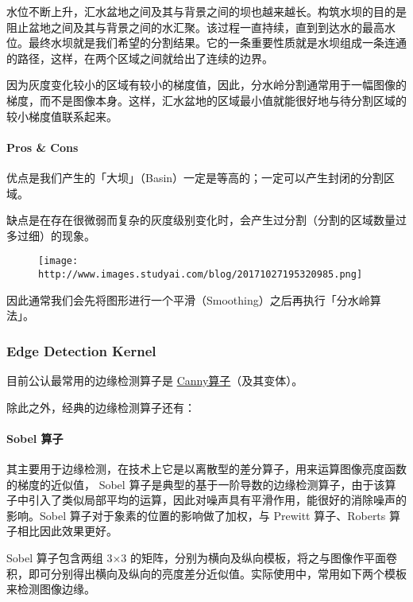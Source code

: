 \documentclass[
]{article}
\begin{document}
水位不断上升，汇水盆地之间及其与背景之间的坝也越来越长。构筑水坝的目的是阻止盆地之间及其与背景之间的水汇聚。该过程一直持续，直到到达水的最高水位。最终水坝就是我们希望的分割结果。它的一条重要性质就是水坝组成一条连通的路径，这样，在两个区域之间就给出了连续的边界。

因为灰度变化较小的区域有较小的梯度值，因此，分水岭分割通常用于一幅图像的梯度，而不是图像本身。这样，汇水盆地的区域最小值就能很好地与待分割区域的较小梯度值联系起来。

\hypertarget{header-n38}{%
\paragraph{Pros \& Cons}\label{header-n38}}

优点是我们产生的「大坝」（Basin）一定是等高的；一定可以产生封闭的分割区域。

缺点是在存在很微弱而复杂的灰度级别变化时，会产生过分割（分割的区域数量过多过细）的现象。

\begin{figure}
\centering
\texttt{[image: http://www.images.studyai.com/blog/20171027195320985.png]}
\caption{}
\end{figure}

因此通常我们会先将图形进行一个平滑（Smoothing）之后再执行「分水岭算法」。

\hypertarget{header-n43}{%
\subsubsection{Edge Detection Kernel}\label{header-n43}}

目前公认最常用的边缘检测算子是
\href{https://zh.wikipedia.org/wiki/Canny算子}{Canny算子}（及其变体）。

除此之外，经典的边缘检测算子还有：

\hypertarget{header-n46}{%
\paragraph{Sobel 算子}\label{header-n46}}

其主要用于边缘检测，在技术上它是以离散型的差分算子，用来运算图像亮度函数的梯度的近似值，
Sobel
算子是典型的基于一阶导数的边缘检测算子，由于该算子中引入了类似局部平均的运算，因此对噪声具有平滑作用，能很好的消除噪声的影响。Sobel
算子对于象素的位置的影响做了加权，与 Prewitt 算子、Roberts
算子相比因此效果更好。

Sobel 算子包含两组 3×3
的矩阵，分别为横向及纵向模板，将之与图像作平面卷积，即可分别得出横向及纵向的亮度差分近似值。实际使用中，常用如下两个模板来检测图像边缘。
\end{document}
